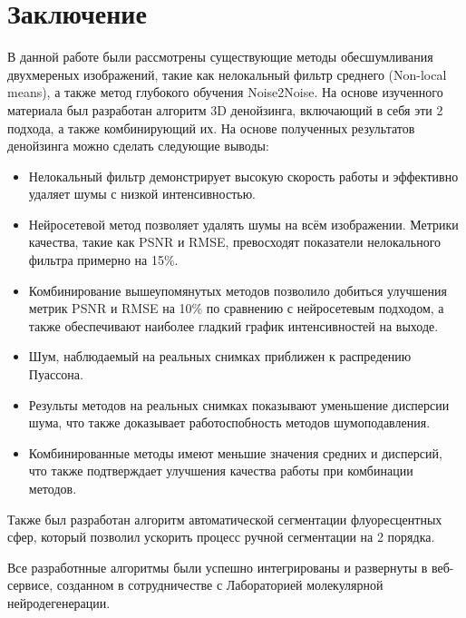 \chapter*{Заключение} \label{ch-conclusion}
\par В данной работе были рассмотрены существующие методы обесшумливания двухмереных изображений, такие как нелокальный фильтр среднего (Non-local means), а также метод глубокого обучения Noise2Noise. На основе изученного материала был разработан алгоритм 3D денойзинга, включающий в себя эти 2 подхода, а также комбинирующий их. На основе полученных результатов денойзинга можно сделать следующие выводы:
\begin{itemize}[]
	\item Нелокальный фильтр демонстрирует высокую скорость работы и эффективно удаляет шумы с низкой интенсивностью.
	\item Нейросетевой метод позволяет удалять шумы на всём изображении. Метрики качества, такие как PSNR и RMSE, превосходят показатели нелокального фильтра примерно  на 15\%.
	\item Комбинирование вышеупомянутых методов позволило добиться улучшения метрик PSNR и RMSE на 10\% по сравнению с нейросетевым подходом, а также обеспечивают наиболее гладкий график интенсивностей на выходе.
	\item Шум, наблюдаемый на реальных снимках приближен к распредению Пуассона.
	\item Результы методов на реальных снимках показывают уменьшение дисперсии шума, что также доказывает работоспобность методов шумоподавления.
	\item Комбинированные методы имеют меньшие значения средних и дисперсий, что также подтверждает улучшения качества работы при комбинации методов.
\end{itemize}
\par Также был разработан алгоритм автоматической сегментации флуоресцентных сфер, который позволил ускорить процесс ручной сегментации на 2 порядка.
\par Все разработнные алгоритмы были успешно интегрированы и развернуты в веб-сервисе, созданном в сотрудничестве с Лабораторией молекулярной нейродегенерации. 
